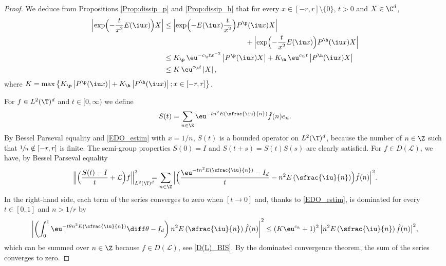\begin{proof}
We deduce from Propositions \ref{Prop:dissip_p} and \ref{Prop:dissip_h} that for every $x \in [-r,r]\setminus\{0\}$, $t> 0$ and $X \in \C^d$,
\begin{equation} \label{EDO_estim}
\begin{aligned}
\Bigl\lvert \exp\Bigl(-\frac{t}{x^2} E(\iu x) \Bigr) X \Bigl\rvert
& \leq
\Bigl\lvert \exp\Bigl(- E(\iu x) \frac{t}{x^2} \Bigr) P^\p(\iu x) X \Bigr\rvert\\
&\hspace*{4cm} +
\Bigl\lvert \exp\Bigl(- \frac{t}{x^2} E(\iu x) \Bigr) P^\h(\iu x) X \Bigr\rvert
\\ & \leq
K_\p\, \eu^{-c_\p tx^{-2}} \left\lvert P^\p(\iu x) X \right\rvert
+
K_\h\, \eu^{c_\h t} \left\lvert P^\h(\iu x) X \right\rvert
\\ & \leq
K\, \eu^{c_\h t} \left\lvert X \right\rvert,
\end{aligned}
\end{equation}
where $K=\max\left\{ K_\p \left\lvert P^\p(\iu x) \right\rvert
+ K_\h \left\lvert P^\h(\iu x) \right\rvert ; x \in [-r,r] \right\}$.

For $f \in L^2(\T)^d$ and $t\in[0,\infty)$ we define
\[
S(t)=\sum_{n\in\Z} \eu^{-tn^2 E\left(\sfrac{\iu}{n} \right)} \hat{f}(n) e_n.
\]
By Bessel Parseval equality and \eqref{EDO_estim} with $x=1/n$, $S(t)$ is a bounded operator on $L^2(\T)^d$, because the number of $n\in\Z$ such that $\sfrac{1}{n} \notin [-r,r]$ is finite.
The semi-group properties $S(0)=I$ and $S(t+s)=S(t) S(s)$ are clearly satisfied. For $f\in D(\mathcal{L})$, we have, by Bessel Parseval equality
\[
\Bigl\lVert \Bigl(\frac{S(t)-I}{t} + \mathcal{L} \Bigr)f \Bigr\rVert_{L^2(\T)^d}^2\mkern-12mu
=
\sum_{n\in\Z}\, \Bigl\lvert \Bigl(\dfrac{\eu^{-tn^2 E\left(\sfrac{\iu}{n} \right)}-I_d}{t} - n^2 E\left(\sfrac{\iu}{n}\right) \Bigr) \hat{f}(n)\Bigr\rvert^2.
\]
In the right-hand side, each term of the series converges to zero when $[t \to 0]$ and, thanks to \eqref{EDO_estim}, is dominated for every $t \in [0,1]$ and $n>1/r$ by
\[
\left\lvert
\left(\int_0^1 \eu^{-t\theta n^2 E\left(\sfrac{\iu}{n} \right)} \diff\theta - I_d \right) n^2 E\left(\sfrac{\iu}{n}\right) \hat{f}(n)\right\rvert^2 \leq (K \eu^{c_h} + 1)^2\,\bigl\lvert n^2 E\left(\sfrac{\iu}{n}\right) \hat{f}(n)\bigr\rvert^2,
\]
which can be summed over $n\in\Z$ because $f\in D(\mathcal{L})$, see \eqref{D(L)_BIS}.
By the dominated convergence theorem, the sum of the series converges to zero.
\end{proof}

